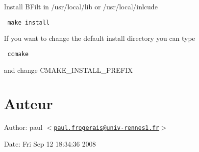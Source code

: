 Install BFilt in /usr/local/lib or /usr/local/inlcude 

\begin{Code}\begin{verbatim} make install
\end{verbatim}
\end{Code}

 If you want to change the default install directory you can type 

\begin{Code}\begin{verbatim} ccmake 
\end{verbatim}
\end{Code}

 and change CMAKE\_\-INSTALL\_\-PREFIX \hypertarget{index_auteur}{}\section{Auteur}\label{index_auteur}
\begin{Desc}
\item[Author:]paul $<$\href{mailto:paul.frogerais@univ-rennes1.fr}{\tt paul.frogerais@univ-rennes1.fr}$>$ \end{Desc}
\begin{Desc}
\item[Date:]Fri Sep 12 18:34:36 2008 \end{Desc}
